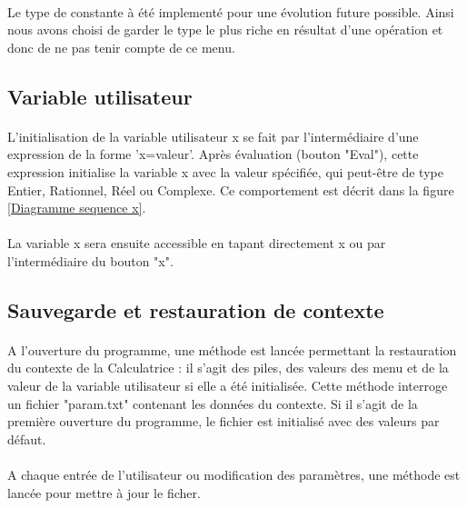 \documentclass[a4paper,12pt]{article}
\begin{document}
		\paragraph{}Le type de constante à été implementé pour une évolution future possible. Ainsi nous avons choisi de garder le type le plus riche en résultat d'une opération et donc de ne pas tenir compte de ce menu.

	\subsection{Variable utilisateur}
		\paragraph{}L'initialisation de la variable utilisateur x se fait par l'intermédiaire d'une expression de la forme 'x=valeur'. Après évaluation (bouton "Eval"), cette expression initialise la variable x avec la valeur spécifiée, qui peut-être de type Entier, Rationnel, Réel ou Complexe. Ce comportement est décrit dans la figure \ref{Diagramme sequence x}.

		\paragraph{}La variable x sera ensuite accessible en tapant directement x ou par l'intermédiaire du bouton "x".

	\subsection{Sauvegarde et restauration de contexte}
		\paragraph{}A l'ouverture du programme, une méthode est lancée permettant la restauration du contexte de la Calculatrice : il s'agit des piles, des valeurs des menu et de la valeur de la variable utilisateur si elle a été initialisée. Cette méthode interroge un fichier "param.txt" contenant les données du contexte. Si il s'agit de la première ouverture du programme, le fichier est initialisé avec des valeurs par défaut.

		\paragraph{}A chaque entrée de l'utilisateur ou modification des paramètres, une méthode est lancée pour mettre à jour le ficher.
\end{document}

